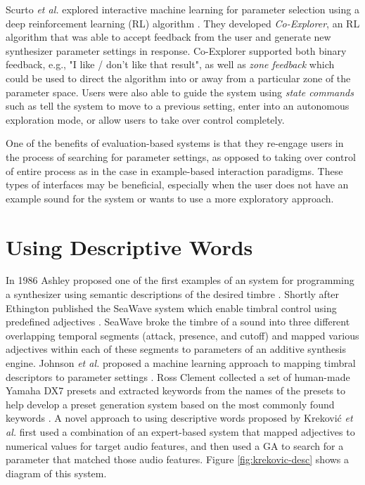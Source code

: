 Scurto \textit{et al.} \cite{scurto2021designing} explored interactive machine learning for parameter selection using a deep reinforcement learning (RL) algorithm \cite{sutton2018reinforcement}. They developed \textit{Co-Explorer}, an RL algorithm that was able to accept feedback from the user and generate new synthesizer parameter settings in response. Co-Explorer supported both binary feedback, e.g., "I like / don't like that result", as well as \textit{zone feedback} which could be used to direct the algorithm into or away from a particular zone of the parameter space. Users were also able to guide the system using \textit{state commands} such as tell the system to move to a previous setting, enter into an autonomous exploration mode, or allow users to take over control completely.

One of the benefits of evaluation-based systems is that they re-engage users in the process of searching for parameter settings, as opposed to taking over control of entire process as in the case in example-based interaction paradigms. These types of interfaces may be beneficial, especially when the user does not have an example sound for the system or wants to use a more exploratory approach.

\section{Using Descriptive Words}\label{section:descriptive-words}
In 1986 Ashley proposed one of the first examples of an system for programming a synthesizer using semantic descriptions of the desired timbre \cite{ashley1986knowledge}. Shortly after Ethington published the SeaWave system which enable timbral control using predefined adjectives \cite{ethington1994seawave}. SeaWave broke the timbre of a sound into three different overlapping temporal segments (attack, presence, and cutoff) and mapped various adjectives within each of these segments to parameters of an additive synthesis engine. Johnson \textit{et al.} proposed a machine learning approach to mapping timbral descriptors to parameter settings \cite{johnson2006timbre}. Ross Clement collected a set of human-made Yamaha DX7 presets and extracted keywords from the names of the presets to help develop a preset generation system based on the most commonly found keywords \cite{clement2011automatic}. A novel approach to using descriptive words proposed by Krekovi\'{c} \textit{et al.} \cite{krekovic2016algorithm} first used a combination of an expert-based system that mapped adjectives to numerical values for target audio features, and then used a GA to search for a parameter that matched those audio features. Figure \ref{fig:krekovic-desc} shows a diagram of this system.

